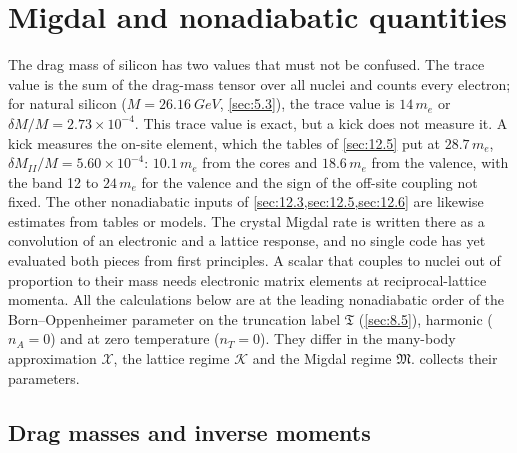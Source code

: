\section{Migdal and nonadiabatic quantities}\label{app:E.18}

The drag mass of silicon has two values that must not be confused. The trace value is the sum of the drag-mass tensor over all nuclei and counts every electron; for natural silicon ($M = \SI{26.16}{GeV}$, \cref{sec:5.3}), the trace value is $14\,m_e$ or $\delta M/M = 2.73\times10^{-4}$. This trace value is exact, but a kick does not measure it. A kick measures the on-site element, which the tables of \cref{sec:12.5} put at $28.7\,m_e$, $\delta M_{II}/M = 5.60\times10^{-4}$: $10.1\,m_e$ from the cores and $18.6\,m_e$ from the valence, with the band 12 to $24\,m_e$ for the valence and the sign of the off-site coupling not fixed. The other nonadiabatic inputs of \cref{sec:12.3,sec:12.5,sec:12.6} are likewise estimates from tables or models. The crystal Migdal rate is written there as a convolution of an electronic and a lattice response, and no single code has yet evaluated both pieces from first principles. A scalar that couples to nuclei out of proportion to their mass needs electronic matrix elements at reciprocal-lattice momenta. All the calculations below are at the leading nonadiabatic order of the Born--Oppenheimer parameter on the truncation label $\mathfrak{T}$ (\cref{sec:8.5}), harmonic ($n_A = 0$) and at zero temperature ($n_T = 0$). They differ in the many-body approximation $\mathcal{X}$, the lattice regime $\mathcal{K}$ and the Migdal regime $\mathfrak{M}$.  collects their parameters.

\subsection{Drag masses and inverse moments}\label{app:E.18-drag}

